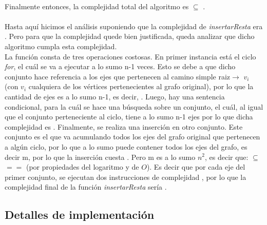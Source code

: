 \paragraph{}
Finalmente entonces, la complejidad total del algoritmo es  $\subseteq$ .

\paragraph{}
Hasta aquí hicimos el análisis suponiendo que la complejidad de \textit{insertarResta} era . Pero para que la complejidad quede bien justificada, queda analizar que dicho algoritmo cumpla esta complejidad.\\
La función consta de tres operaciones costosas. En primer instancia está el ciclo \textit{for}, el cuál se va a ejecutar a lo sumo n-1 veces. Esto se debe a que dicho conjunto hace referencia a los ejes que pertenecen al camino simple raiz$\rightarrow$ $v_i$ (con $v_i$ cualquiera de los vértices pertenecientes al grafo original), por lo que la cantidad de ejes es a lo sumo n-1, es decir, . Luego, hay una sentencia condicional, para la cuál se hace una búsqueda sobre un conjunto, el cuál, al igual que el conjunto perteneciente al ciclo, tiene a lo sumo n-1 ejes por lo que dicha complejidad es . Finalmente, se realiza una inserción en otro conjunto. Este conjunto es el que va acumulando todos los ejes del grafo original que pertenecen a algún ciclo, por lo que a lo sumo puede contener todos los ejes del grafo, es decir m, por lo que la inserción cuesta . Pero m es a lo sumo $n^2$, es decir que:  $\subseteq$  $==$  (por propiedades del logaritmo y de $O$). Es decir que por cada eje del primer conjunto, se ejecutan dos instrucciones de complejidad , por lo que la complejidad final de la función \textit{insertarResta} sería .


\subsection{Detalles de implementación}
\label{imp2}

